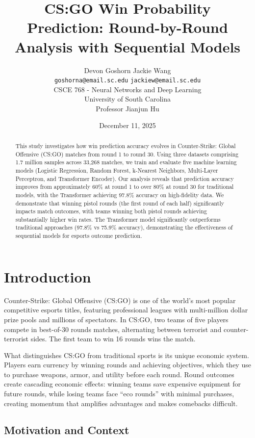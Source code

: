 \documentclass[10pt,twocolumn]{article}
\title{CS:GO Win Probability Prediction: Round-by-Round Analysis with Sequential Models}
\author{
    Devon Goshorn \quad Jackie Wang \\
    \texttt{goshorna@email.sc.edu} \quad \texttt{jackiew@email.sc.edu} \\[0.5em]
    CSCE 768 - Neural Networks and Deep Learning \\
    University of South Carolina \\
    Professor Jianjun Hu
}
\date{December 11, 2025}
\begin{document}
\maketitle

\begin{abstract}
This study investigates how win prediction accuracy evolves in Counter-Strike: Global Offensive (CS:GO) matches from round 1 to round 30. Using three datasets comprising 1.7 million samples across 33,268 matches, we train and evaluate five machine learning models (Logistic Regression, Random Forest, k-Nearest Neighbors, Multi-Layer Perceptron, and Transformer Encoder). Our analysis reveals that prediction accuracy improves from approximately 60\% at round 1 to over 80\% at round 30 for traditional models, with the Transformer achieving 97.8\% accuracy on high-fidelity data. We demonstrate that winning pistol rounds (the first round of each half) significantly impacts match outcomes, with teams winning both pistol rounds achieving substantially higher win rates. The Transformer model significantly outperforms traditional approaches (97.8\% vs 75.9\% accuracy), demonstrating the effectiveness of sequential models for esports outcome prediction.
\end{abstract}

\section{Introduction}

Counter-Strike: Global Offensive (CS:GO) is one of the world's most popular competitive esports titles, featuring professional leagues with multi-million dollar prize pools and millions of spectators. In CS:GO, two teams of five players compete in best-of-30 rounds matches, alternating between terrorist and counter-terrorist sides. The first team to win 16 rounds wins the match.

What distinguishes CS:GO from traditional sports is its unique economic system. Players earn currency by winning rounds and achieving objectives, which they use to purchase weapons, armor, and utility before each round. Round outcomes create cascading economic effects: winning teams save expensive equipment for future rounds, while losing teams face ``eco rounds'' with minimal purchases, creating momentum that amplifies advantages and makes comebacks difficult.

\subsection{Motivation and Context}
\end{document}
